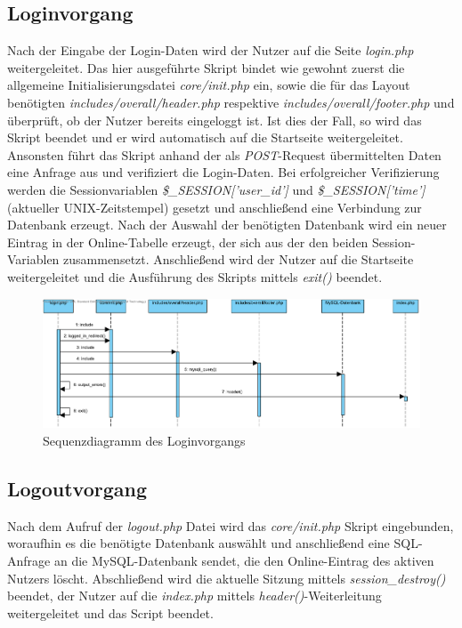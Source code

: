 \documentclass[fontsize = 12pt, paper = a4]{scrreprt}
\begin{document}
\subsection{Loginvorgang}
Nach der Eingabe der Login-Daten wird der Nutzer auf die Seite \textit{login.php} weitergeleitet. Das hier ausgeführte Skript bindet wie gewohnt zuerst die allgemeine Initialisierungsdatei \textit{core/init.php} ein, sowie die für das Layout benötigten \textit{includes/overall/header.php} respektive \textit{includes/overall/footer.php} und überprüft, ob der Nutzer bereits eingeloggt ist. Ist dies der Fall, so wird das Skript beendet und er wird automatisch auf die Startseite weitergeleitet.\\
Ansonsten führt das Skript anhand der als \textit{POST}-Request übermittelten Daten eine Anfrage aus und verifiziert die Login-Daten. Bei erfolgreicher Verifizierung werden die Sessionvariablen \textit{\$\_SESSION['user\_id']} und \textit{\$\_SESSION['time']} (aktueller UNIX-Zeitstempel) gesetzt und anschließend eine Verbindung zur Datenbank erzeugt. Nach der Auswahl der benötigten Datenbank wird ein neuer Eintrag in der Online-Tabelle erzeugt, der sich aus der den beiden Session-Variablen zusammensetzt. Anschließend wird der Nutzer auf die Startseite weitergeleitet und die Ausführung des Skripts mittels \textit{exit()} beendet.\\

\begin{figure}[h]
\centering
\includegraphics[scale = 0.5]{login}
\caption[Sequenzdiagramm des Loginvorgangs]{Sequenzdiagramm des Loginvorgangs}
\label{login}
\end{figure}

\newpage
\subsection{Logoutvorgang}
Nach dem Aufruf der \textit{logout.php} Datei wird das \textit{core/init.php} Skript eingebunden, woraufhin es die benötigte Datenbank auswählt und anschließend eine SQL-Anfrage an die MySQL-Datenbank sendet, die den \glqq Online\grqq-Eintrag des aktiven Nutzers löscht. Abschließend wird die aktuelle Sitzung mittels \textit{session\_destroy()} beendet, der Nutzer auf die \textit{index.php} mittels \textit{header()}-Weiterleitung weitergeleitet und das Script beendet.
\end{document}
